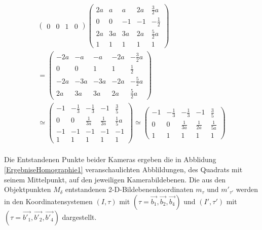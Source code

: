 \begin{gather}
\begin{pmatrix}
		0&0&1&0
	\end{pmatrix}
	\begin{pmatrix}
		2a&a&a&2a&\frac{3}{2}a\\
		0&0&-1&-1&-\frac{1}{2}\\
		2a&3a&3a&2a&\frac{5}{2}a\\
		1&1&1&1&1
	\end{pmatrix}\\=
	\begin{pmatrix}
		-2a&-a&-a&-2a&-\frac{3}{2}a\\
		0&0&1&1&\frac{1}{2}\\
		-2a&-3a&-3a&-2a&-\frac{5}{2}a\\
		2a&3a&3a&2a&\frac{5}{2}a
	\end{pmatrix}\\
	\simeq
	\begin{pmatrix}
		-1&-\frac{1}{3}&-\frac{1}{3}&-1&\frac{3}{5}\\
		0&0&\frac{1}{3a}&\frac{1}{2a}&\frac{1}{5}a\\
		-1&-1&-1&-1&-1\\
		1&1&1&1&1
	\end{pmatrix}
	\simeq
	\begin{pmatrix}
		-1&-\frac{1}{3}&-\frac{1}{3}&-1&\frac{3}{5}\\
		0&0&\frac{1}{3a}&\frac{1}{2a}&\frac{1}{5a}\\
		1&1&1&1&1
	\end{pmatrix}
\end{gather}\\

Die Entstandenen Punkte beider Kameras ergeben die in Abblidung \ref{ErgebniseHomographie1} veranschaulichten Abblildungen, des Quadrats mit seinem Mittelpunkt, auf den jeweiligen Kamerabildebenen. Die aus den Objektpunkten $M_\delta$ entstandenen 2-D-Bildebenenkoordinaten $m_\tau$ und $m'_{\tau'}$ werden in den Koordinatensystemen $(I,\tau)$ mit $(\tau = \vec{b_1},\vec{b_2},\vec{b_4})$ und $(I',\tau')$ mit $(\tau = \vec{b'_1},\vec{b'_2},\vec{b'_4})$ dargestellt.\\

